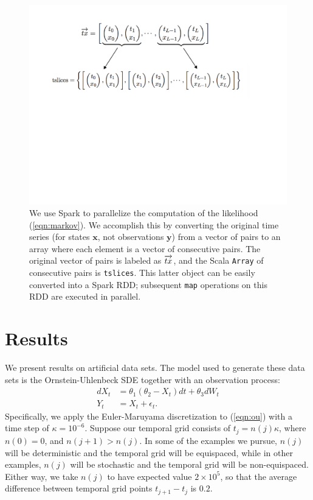 \documentclass[wcp]{jmlr}
\begin{document}
\begin{figure}[ht]
\begin{center}
\includegraphics[width=5in]{vec_to_slice}
\end{center}
\vspace{-0.5in}
\caption{We use Spark to parallelize the computation of the likelihood
(\ref{eqn:markov}).  We accomplish this by converting the
original time series (for states $\mathbf{x}$, not observations
$\mathbf{y}$) from a vector of pairs to an array where each element is
a vector of consecutive pairs.  The original vector of pairs is
labeled as $\protect\overrightarrow{tx}$, and the Scala \texttt{Array}
of consecutive pairs is \texttt{tslices}.  This latter object can be
easily converted into a Spark RDD; subsequent \texttt{map} operations
on this RDD are executed in parallel.}
\label{fig:implementation2}
\end{figure}

\section{Results}
\label{sect:results}
We present results on artificial data sets.  The model used to
generate these data sets is the Ornstein-Uhlenbeck SDE together with
an observation process:
\begin{align}
\label{eqn:ou}
{d}X_t &= \theta_1 (\theta_2 - X_t) {d}t + \theta_3 {d}W_t \\
\label{eqn:ou_obs}
Y_t &= X_t + \epsilon_t.
\end{align}
Specifically, we apply the Euler-Maruyama discretization to
(\ref{eqn:ou}) with a time step of $\kappa = 10^{-6}$.  Suppose our
temporal grid consists of $t_j = n(j) \kappa$, where $n(0) = 0$,
and $n(j+1) > n(j)$.  In some of the examples we pursue, $n(j)$ will
be deterministic and the temporal grid will be equispaced, while in other examples, $n(j)$ will
be stochastic and the temporal grid will be non-equispaced.  Either
way, we take $n(j)$ to have expected value $2 \times 10^5$, so that
the average difference between temporal grid points $t_{j+1} - t_j$ is $0.2$.
\end{document}

